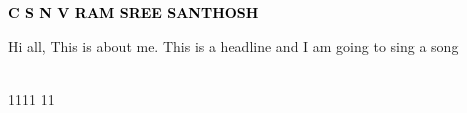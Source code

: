\documentclass[letterpaper,9pt]{article}
\newcommand{\phvfont}[1]{{\fontfamily{phv}\selectfont #1}}
\begin{document}
    
    \begin{minipage}[t]{0.5\textwidth} 
      \vspace{-\baselineskip} 
      
      { \fontsize{16}{20} \textcolor{black}{\textbf{\phvfont{C S N V RAM SREE SANTHOSH}}}} 
      
      \vspace{10pt}
      \begin{minipage}[t]{0.9\textwidth}
        \phvfont{\small Hi all, This is about me. This is a headline and I am going to sing a song}
      \end{minipage}

    \end{minipage}
    \hfill
    \begin{minipage}[t]{0.24\textwidth} 
      \vspace{-\baselineskip} 
      
      \\ 
       1111 11\\
      \
      
    \end{minipage}
    \begin{minipage}[t]{0.24\textwidth} %
      \vspace{-\baselineskip} %
      
      \	
      \
      \    
        
    \end{minipage}
    \vspace*{7mm}
     
\end{document}
